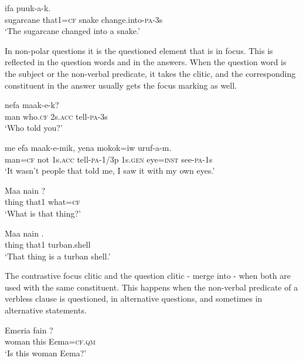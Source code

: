 \ea%
\label{ex:9:x1711}
\gll {}    ifa  puuk-a-k. \\
sugarcane  that1=\textsc{cf}  snake  change.into-\textsc{pa}-3s      \\
\glt`The sugarcane changed into a snake.'
\z


In non-polar questions it is the questioned element that is in focus. This is reflected in the question words and in the answers. When the question word is the subject or the non-verbal predicate, it takes the  clitic, and the corresponding constituent in the answer usually gets the focus marking as well.

\ea%
\label{ex:9:x1714}
\gll {}   nefa  maak-e-k?\\
man  who.\textsc{cf}  2s.\textsc{acc}  tell-\textsc{pa}-3s      \\
\glt`Who told you?'
\z


\ea%
\label{ex:9:x1715}
\gll {}  me  efa  maak-e-mik,  yena  mokok=iw  uruf-a-m. \\
man=\textsc{cf}  not  1s.\textsc{acc}  tell-\textsc{pa}-1/3p  1s.\textsc{gen}  eye=\textsc{inst}  see-\textsc{pa}-1s      \\
\glt`It wasn't people that told me, I saw it with my own eyes.'
\z


\ea%
\label{ex:9:x1712}
\gll Maa  nain  ? \\
thing  that1  what=\textsc{cf}      \\
\glt`What is that thing?'
\z


\ea%
\label{ex:9:x1713}
\gll Maa  nain  . \\
thing  that1  turban.shell      \\
\glt`That thing is a turban shell.'
\z
{}


The contrastive focus clitic and the question clitic - merge into - when both are used with the same constituent. This happens when the non-verbal predicate of a verbless clause is questioned, in alternative questions, and sometimes in alternative statements.

\ea%
\label{ex:9:x1716}
\gll Emeria  fain  ? \\
woman  this  Eema=\textsc{cf}.\textsc{qm}      \\
\glt`Is this woman Eema?'
\z


